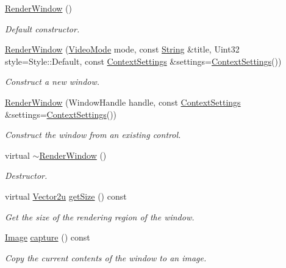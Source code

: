 \begin{DoxyCompactItemize}
\item 
\hyperlink{classsf_1_1_render_window_a839bbf336bdcafb084dafc3076fc9021}{Render\+Window} ()
\begin{DoxyCompactList}\small\item\em Default constructor. \end{DoxyCompactList}\item 
\hyperlink{classsf_1_1_render_window_aebef983e01f677bf5a66cefc4d547647}{Render\+Window} (\hyperlink{classsf_1_1_video_mode}{Video\+Mode} mode, const \hyperlink{classsf_1_1_string}{String} \&title, Uint32 style=Style\+::\+Default, const \hyperlink{structsf_1_1_context_settings}{Context\+Settings} \&settings=\hyperlink{structsf_1_1_context_settings}{Context\+Settings}())
\begin{DoxyCompactList}\small\item\em Construct a new window. \end{DoxyCompactList}\item 
\hyperlink{classsf_1_1_render_window_a25c0af7d515e710b6eebc9c6be952aa5}{Render\+Window} (Window\+Handle handle, const \hyperlink{structsf_1_1_context_settings}{Context\+Settings} \&settings=\hyperlink{structsf_1_1_context_settings}{Context\+Settings}())
\begin{DoxyCompactList}\small\item\em Construct the window from an existing control. \end{DoxyCompactList}\item 
virtual \hyperlink{classsf_1_1_render_window_a3407e36bfc1752d723140438a825365c}{$\sim$\+Render\+Window} ()
\begin{DoxyCompactList}\small\item\em Destructor. \end{DoxyCompactList}\item 
virtual \hyperlink{classsf_1_1_vector2}{Vector2u} \hyperlink{classsf_1_1_render_window_a2c7ff414be32621a453745cf2a0f8a3e}{get\+Size} () const 
\begin{DoxyCompactList}\small\item\em Get the size of the rendering region of the window. \end{DoxyCompactList}\item 
\hyperlink{classsf_1_1_image}{Image} \hyperlink{classsf_1_1_render_window_a9bd8655d0bac83145bfc329ea7a6d538}{capture} () const 
\begin{DoxyCompactList}\small\item\em Copy the current contents of the window to an image. \end{DoxyCompactList}\end{DoxyCompactItemize}
